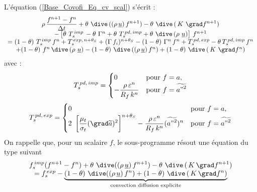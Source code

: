 L'\'{e}quation (\ref{Base_Covofi_Eq_cv_scal}) s'\'ecrit :
\begin{equation}\label{Base_Covofi_Eq_scal_tempo}
\begin{array}{c}
\displaystyle
 \rho\,\frac {f^{n+1}-f^{n}}{\Delta t} +
\theta \,\,\dive\,((\rho\,\underline{u})\,f^{n+1})- \theta \,\,\dive\,(\,K\ \grad f^{n+1})
\\
-\left[ \theta\,\, T_s^{\,imp}\,- \theta\,\, \Gamma^{n} + \theta\,\, T_s^{\,pd,\,imp}+\theta\,\,
\dive\,(\rho\ \underline{u})\right]\,f^{n+1}
\\
= (1-\theta)\,\,T_s^{\,imp}\,f^{n} + T_s^{\,exp,\,n+\theta_S} +
(\Gamma\,f_i)^{n+\theta_S}-(1-\theta)\,\,\Gamma^{n}\,
f^{n}+ T_s^{\,pd,\,exp}-\theta\,T_s^{\,pd,\,imp}\,f^{n}
\\
+ (1-\theta) \,\, f^{n}\,\dive\,(\rho\ \underline{u})- (1-\theta) \,\, \dive\,((\rho\,\underline{u})\,f^{n})
+ (1-\theta)\,\, \dive\,(\,K\ \grad f^{n})
\end{array}
\end{equation}
avec :
\begin{equation}
T_s^{\,pd,\,imp} =
\begin{cases}
0 & \text{pour $f=a$}, \\
- \displaystyle \frac{\rho\,\varepsilon^n}{R_f \,k^n} &  \text{pour $f=\widetilde{{a"}^2}$}
\end{cases}
\end{equation}
\begin{equation}
T_s^{\,pd,\,exp}=
\begin{cases}
0 & \text{pour $f=a$}, \\
2\ \displaystyle\left[\frac{\mu_t}{\sigma_t}(\grad
\widetilde{a})^2\right]^{n+\theta_S} -
\frac{\rho\,\varepsilon^n}{R_f\,k^n}(\widetilde{{a"}^2})^n & \text{pour
$f=\widetilde{{a"}^2}$}
\end{cases}
\end{equation}
On rappelle que, pour un scalaire $f$, le sous-programme 
r\'{e}sout une \'{e}quation du type suivant
\label{Base_Covofi_Eq_Codits}
\begin{equation}
\begin{array}{c}
\displaystyle f_s^{\,imp} (f^{n+1} - f^{n}) +
\theta \,\, \dive((\rho\,\underline{u})\,f^{n+1})- \theta \,\, \dive\,(\,K\,\grad f^{n+1})
\\
= f_s^{\,exp} -\underbrace{(1-\theta) \,\, \dive((\rho\,\underline{u})\,f^{n}) + (1-\theta)
\,\, \dive\,(\,K\,\grad f^{n})}_{\text{convection diffusion explicite}}
\end{array}
\end{equation}
